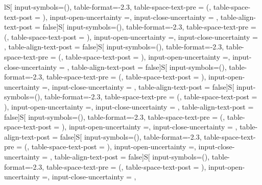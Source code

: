 \begin{table}[!h]

\caption{\label{tab:norway_by_party_mech} \textbf{Mechanisms leading to lower incumbency advantage: Difference-in-Discontinuity Estimates On Additional Outcomes, Norway.}}
\centering
\fontsize{9}{11}\selectfont
\begin{threeparttable}
\begin{tabular}[t]{lS[
              input-symbols=(),
              table-format=-2.3,
              table-space-text-pre    = (,
              table-space-text-post   = ),
              input-open-uncertainty  =,
              input-close-uncertainty = ,
              table-align-text-post = false]S[
              input-symbols=(),
              table-format=-2.3,
              table-space-text-pre    = (,
              table-space-text-post   = ),
              input-open-uncertainty  =,
              input-close-uncertainty = ,
              table-align-text-post = false]S[
              input-symbols=(),
              table-format=-2.3,
              table-space-text-pre    = (,
              table-space-text-post   = ),
              input-open-uncertainty  =,
              input-close-uncertainty = ,
              table-align-text-post = false]S[
              input-symbols=(),
              table-format=-2.3,
              table-space-text-pre    = (,
              table-space-text-post   = ),
              input-open-uncertainty  =,
              input-close-uncertainty = ,
              table-align-text-post = false]S[
              input-symbols=(),
              table-format=-2.3,
              table-space-text-pre    = (,
              table-space-text-post   = ),
              input-open-uncertainty  =,
              input-close-uncertainty = ,
              table-align-text-post = false]S[
              input-symbols=(),
              table-format=-2.3,
              table-space-text-pre    = (,
              table-space-text-post   = ),
              input-open-uncertainty  =,
              input-close-uncertainty = ,
              table-align-text-post = false]S[
              input-symbols=(),
              table-format=-2.3,
              table-space-text-pre    = (,
              table-space-text-post   = ),
              input-open-uncertainty  =,
              input-close-uncertainty = ,
              table-align-text-post = false]S[
              input-symbols=(),
              table-format=-2.3,
              table-space-text-pre    = (,
              table-space-text-post   = ),
              input-open-uncertainty  =,
              input-close-uncertainty = ,
}
\end{tabular}
\end{threeparttable}
\end{table}
